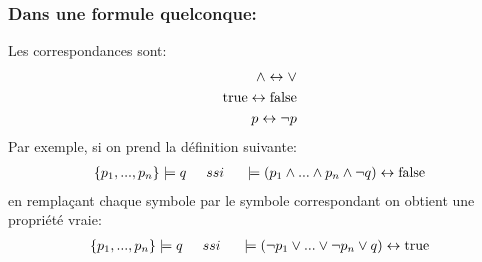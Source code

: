 \subsubsection{Dans une formule quelconque:}

Les correspondances sont:
\begin{align*}
\land \leftrightarrow \lor \\ 
\mathrm{true} \leftrightarrow \mathrm{false} \\ 
p \leftrightarrow \lnot p 
\end{align*}
Par exemple, si on prend la définition suivante:
 \begin{align*}
	 \{p_1,...,p_n\} \models q \hspace{0.5cm}
         ssi \hspace{0.5cm} \models (p_1 \land ... \land p_n \land \lnot q) \leftrightarrow \mathrm{false}
 \end{align*}
en remplaçant chaque symbole par le symbole correspondant on obtient une propriété vraie:
 \begin{align*}
	 \{p_1,...,p_n\} \models q \hspace{0.5cm}
         ssi \hspace{0.5cm} \models ( \lnot p_1 \lor ... \lor \lnot p_n \lor q) \leftrightarrow \mathrm{true}
 \end{align*}



